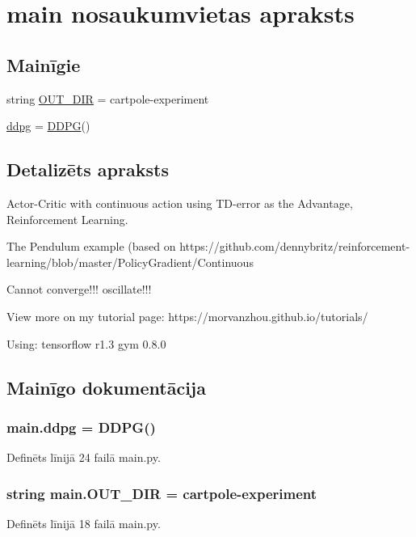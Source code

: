 \hypertarget{namespacemain}{}\section{main nosaukumvietas apraksts}
\label{namespacemain}
\subsection*{Mainīgie}
\begin{DoxyCompactItemize}
\item 
string \hyperlink{namespacemain_a3c06d4083f03655f07172e4ef8e464bf}{O\+U\+T\+\_\+\+D\+IR} = \textquotesingle{}cartpole-\/experiment\textquotesingle{}
\item 
\hyperlink{namespacemain_ac0a261283849e9420511602bb168f4fa}{ddpg} = \hyperlink{classddpg_1_1_d_d_p_g}{D\+D\+PG}()
\end{DoxyCompactItemize}


\subsection{Detalizēts apraksts}
\begin{DoxyVerb}Actor-Critic with continuous action using TD-error as the Advantage, Reinforcement Learning.

The Pendulum example (based on https://github.com/dennybritz/reinforcement-learning/blob/master/PolicyGradient/Continuous%

Cannot converge!!! oscillate!!!

View more on my tutorial page: https://morvanzhou.github.io/tutorials/

Using:
tensorflow r1.3
gym 0.8.0
\end{DoxyVerb}
 

\subsection{Mainīgo dokumentācija}
\subsubsection[{\texorpdfstring{ddpg}{ddpg}}]{\setlength{\rightskip}{0pt plus 5cm}main.\+ddpg = {\bf D\+D\+PG}()}\hypertarget{namespacemain_ac0a261283849e9420511602bb168f4fa}{}\label{namespacemain_ac0a261283849e9420511602bb168f4fa}


Definēts līnijā 24 failā main.\+py.

\subsubsection[{\texorpdfstring{O\+U\+T\+\_\+\+D\+IR}{OUT_DIR}}]{\setlength{\rightskip}{0pt plus 5cm}string main.\+O\+U\+T\+\_\+\+D\+IR = \textquotesingle{}cartpole-\/experiment\textquotesingle{}}\hypertarget{namespacemain_a3c06d4083f03655f07172e4ef8e464bf}{}\label{namespacemain_a3c06d4083f03655f07172e4ef8e464bf}


Definēts līnijā 18 failā main.\+py.

